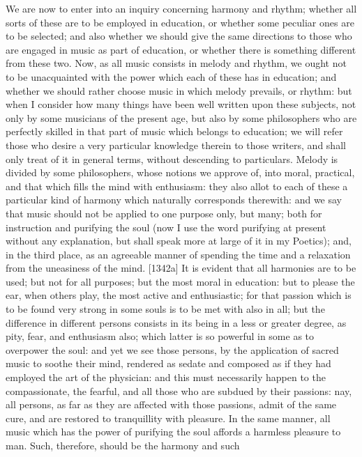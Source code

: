 
We are now to enter into an inquiry concerning harmony and rhythm; whether
all sorts of these are to be employed in education, or whether some
peculiar ones are to be selected; and also whether we should give the same
directions to those who are engaged in music as part of education, or
whether there is something different from these two. Now, as all music
consists in melody and rhythm, we ought not to be unacquainted with the
power which each of these has in education; and whether we should rather
choose music in which melody prevails, or rhythm: but when I consider how
many things have been well written upon these subjects, not only by some
musicians of the present age, but also by some philosophers who are
perfectly skilled in that part of music which belongs to education; we
will refer those who desire a very particular knowledge therein to those
writers, and shall only treat of it in general terms, without descending
to particulars. Melody is divided by some philosophers, whose notions we
approve of, into moral, practical, and that which fills the mind with
enthusiasm: they also allot to each of these a particular kind of harmony
which naturally corresponds therewith: and we say that music should not be
applied to one purpose only, but many; both for instruction and purifying
the soul (now I use the word purifying at present without any explanation,
but shall speak more at large of it in my Poetics); and, in the third
place, as an agreeable manner of spending the time and a relaxation from
the uneasiness of the mind. [1342a] It is evident that all harmonies are
to be used; but not for all purposes; but the most moral in education: but
to please the ear, when others play, the most active and enthusiastic; for
that passion which is to be found very strong in some souls is to be met
with also in all; but the difference in different persons consists in its
being in a less or greater degree, as pity, fear, and enthusiasm also;
which latter is so powerful in some as to overpower the soul: and yet we
see those persons, by the application of sacred music to soothe their
mind, rendered as sedate and composed as if they had employed the art of
the physician: and this must necessarily happen to the compassionate, the
fearful, and all those who are subdued by their passions: nay, all
persons, as far as they are affected with those passions, admit of the
same cure, and are restored to tranquillity with pleasure. In the same
manner, all music which has the power of purifying the soul affords a
harmless pleasure to man. Such, therefore, should be the harmony and such
